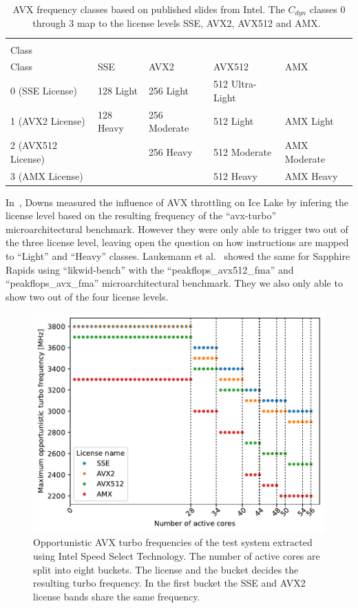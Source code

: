 \begin{table}[t]
	\centering
	\caption{\label{tab:avx-classes}AVX frequency classes based on published slides from Intel.
    The $C_{dyn}$ classes 0 through 3 map to the license levels SSE, AVX2, AVX512 and AMX.~\cite{ServeTheHome_Emerald_Rapids_2023}}
    \begin{tabular}{|l|p{}|p{}|p{}|p{}|}
        \hline
        \diagbox[width=0.24\textwidth]{$C_{dyn}$\\Class}{Instruction\\Class} & SSE & AVX2 & AVX512 & AMX \\
        \hline
        0 (SSE License) & 128 Light & 256 Light & 512 Ultra-Light & \\
        \hline
        1 (AVX2 License) & 128 Heavy & 256 Moderate & 512 Light & AMX Light \\
        \hline
        2 (AVX512 License) & & 256 Heavy & 512 Moderate & AMX Moderate \\
        \hline
        3 (AMX License) & & & 512 Heavy & AMX Heavy \\
        \hline
	\end{tabular}
\end{table}

In~\cite{Downs_2020_AVX_Downclocking}, Downs measured the influence of AVX throttling on Ice Lake by infering the license level based on the resulting frequency of the ``avx-turbo'' microarchitectural benchmark.
However they were only able to trigger two out of the three license level, leaving open the question on how instructions are mapped to ``Light'' and ``Heavy'' classes.
Laukemann et al.~\cite{laukemann_microarchitectural_2024} showed the same for Sapphire Rapids using ``likwid-bench'' with the ``peakflops\_avx512\_fma'' and ``peakflops\_avx\_fma'' microarchitectural benchmark.
They we also only able to show two out of the four license levels.

\begin{figure}[]
    \centering
    \includegraphics[width=0.8\columnwidth]{fig/avx-frequency-license-bands.pdf}
    \caption{\label{fig:p0n-frequencies}Opportunistic AVX turbo frequencies of the test system extracted using Intel Speed Select Technology.
    The number of active cores are split into eight buckets. The license and the bucket decides the resulting turbo frequency.
    In the first bucket the SSE and AVX2 license bands share the same frequency.}
\end{figure}


